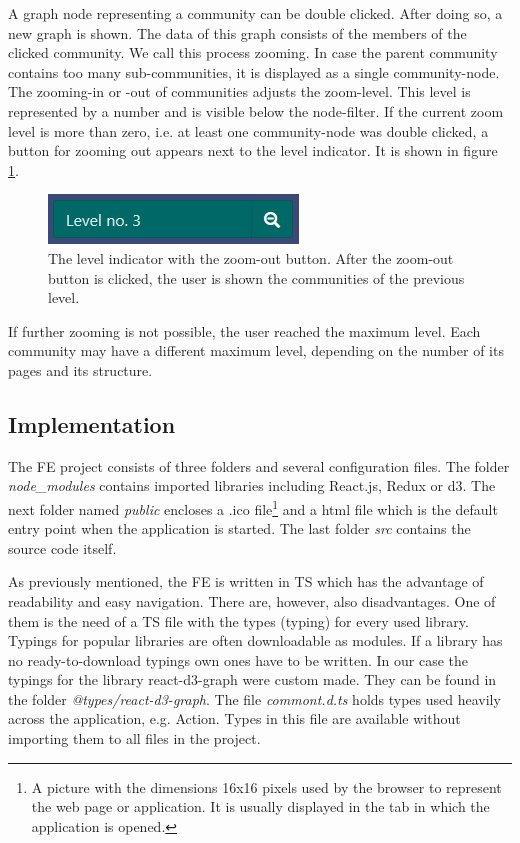 A graph node representing a community can be double clicked. After doing so, a new graph is shown. The data of this graph consists of the members of the clicked community. We call this process zooming. In case the parent community contains too many sub-communities, it is displayed as a single community-node. The zooming-in or -out of communities adjusts the zoom-level. This level is represented by a number and is visible below the node-filter. If the current zoom level is more than zero, i.e. at least one community-node was double clicked, a button for zooming out appears next to the level indicator. It is shown in figure \ref{levelIndicatorWithButton}.
\begin{figure}[ht!]
  \centering
  \includegraphics{Images/levelIndicatorWithButton.png}
  \caption{The level indicator with the zoom-out button. After the zoom-out button is clicked, the user is shown the communities of the previous level.}
  \label{levelIndicatorWithButton}
\end{figure} 


If further zooming is not possible, the user reached the maximum level. Each community may have a different maximum level, depending on the number of its pages and its structure.

\subsection{Implementation}
The FE project consists of three folders and several configuration files. The folder \textit{node\_modules} contains imported libraries including React.js, Redux or d3. The next folder named \textit{public} encloses a .ico file\footnote {A picture with the dimensions 16x16 pixels used by the browser to represent the web page or application. It is usually displayed in the tab in which the application is opened.} and a html file which is the default entry point when the application is started. The last folder \textit{src} contains the source code itself. 

As previously mentioned, the FE is written in TS which has the advantage of readability and easy navigation. There are, however, also disadvantages. One of them is the need of a TS file with the types (typing) for every used library. Typings for popular libraries are often downloadable as modules. If a library has no ready-to-download typings own ones have to be written. In our case the typings for the library react-d3-graph were custom made. They can be found in the folder \textit{@types/react-d3-graph}. The file \textit{commont.d.ts} holds types used heavily across the application, e.g. Action. Types in this file are available without importing them to all files in the project.  


